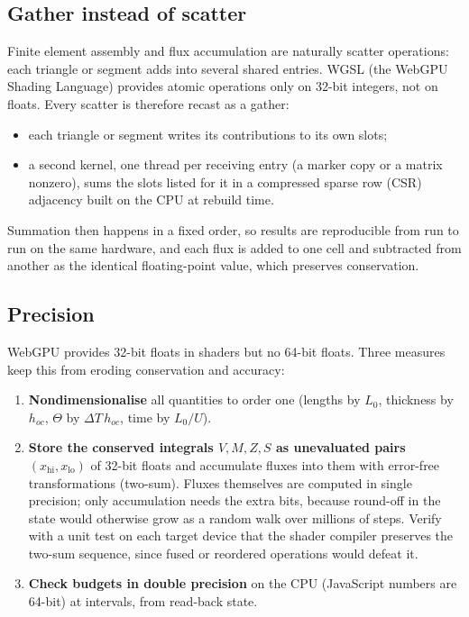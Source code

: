 \documentclass[11pt]{article}
\begin{document}
\subsection{Gather instead of scatter}
Finite element assembly and flux accumulation are naturally scatter operations: each triangle or segment adds into several shared entries. WGSL (the WebGPU Shading Language) provides atomic operations only on 32-bit integers, not on floats. Every scatter is therefore recast as a gather:
\begin{itemize}
\item each triangle or segment writes its contributions to its own slots;
\item a second kernel, one thread per receiving entry (a marker copy or a matrix nonzero), sums the slots listed for it in a compressed sparse row (CSR) adjacency built on the CPU at rebuild time.
\end{itemize}
Summation then happens in a fixed order, so results are reproducible from run to run on the same hardware, and each flux is added to one cell and subtracted from another as the identical floating-point value, which preserves conservation.

\subsection{Precision}
WebGPU provides 32-bit floats in shaders but no 64-bit floats. Three measures keep this from eroding conservation and accuracy:
\begin{enumerate}
\item \textbf{Nondimensionalise} all quantities to order one (lengths by $L_0$, thickness by $h_{oc}$, $\Theta$ by $\Delta T\,h_{oc}$, time by $L_0/U$).
\item \textbf{Store the conserved integrals $V,M,Z,S$ as unevaluated pairs} $(x_{\mathrm{hi}},x_{\mathrm{lo}})$ of 32-bit floats and accumulate fluxes into them with error-free transformations (two-sum). Fluxes themselves are computed in single precision; only accumulation needs the extra bits, because round-off in the state would otherwise grow as a random walk over millions of steps. Verify with a unit test on each target device that the shader compiler preserves the two-sum sequence, since fused or reordered operations would defeat it.
\item \textbf{Check budgets in double precision} on the CPU (JavaScript numbers are 64-bit) at intervals, from read-back state.
\end{enumerate}
\end{document}

